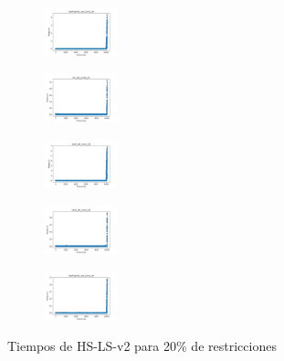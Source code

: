 \begin{figure}[H]
\begin{subfigure}
        \centering
        \includegraphics[width=0.234\textwidth]{img/HS-LS-v2/newthyroid_set_const_20_49258669_time.png}
    \end{subfigure}
    \hfill
    \begin{subfigure}
        \centering
        \includegraphics[width=0.234\textwidth]{img/HS-LS-v2/iris_set_const_20_3773969821_time.png}
    \end{subfigure}
    \hfill
    \begin{subfigure}
        \centering
        \includegraphics[width=0.234\textwidth]{img/HS-LS-v2/ecoli_set_const_20_3773969821_time.png}
    \end{subfigure}
    \hfill
    \begin{subfigure}
        \centering
        \includegraphics[width=0.234\textwidth]{img/HS-LS-v2/rand_set_const_20_3773969821_time.png}
    \end{subfigure}
    \hfill
    \begin{subfigure}
        \centering
        \includegraphics[width=0.234\textwidth]{img/HS-LS-v2/newthyroid_set_const_20_3773969821_time.png}
    \end{subfigure}
    \caption{Tiempos de HS-LS-v2 para 20\% de restricciones}
\end{figure}

